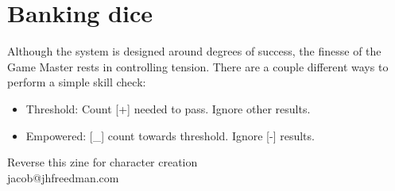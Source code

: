 \documentclass[statementpaper,oneside,article,12pt]{memoir}
\begin{document}
	\section*{Banking dice}
	Although the system is designed around degrees of success, the finesse of the Game Master rests in controlling tension. There are a couple different ways to perform a simple skill check:
	\begin{itemize}
		\item Threshold: Count [+] needed to pass. Ignore other results.
		\item Empowered: [\_] count towards threshold. Ignore [-] results.
	\end{itemize}
	
	
	
	
	\newpage
	
	Reverse this zine for character creation
	\\jacob@jhfreedman.com
	
\end{document}
